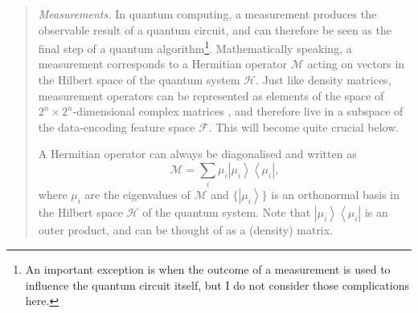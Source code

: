 \documentclass[aps, reprint, onecolumn, nofootinbib, longbibliography]{revtex4-2}
\newcommand{\ket}[1]{\ensuremath{\left| #1 \right \rangle}}
\newcommand{\bra}[1]{\ensuremath{\left \langle #1 \right |}}
\newcommand{\ketbra}[2]{\ket{#1}\!\bra{#2}}
\newcommand{\meas}{\mathcal{M}}
\begin{document}
\begin{quote}
    \textit{Measurements.}  In quantum computing, a measurement produces the observable result of a quantum circuit, and can therefore be seen as the final step of a quantum algorithm\footnote{An important exception is when the outcome of a measurement is used to influence the quantum circuit itself, but I do not consider those complications here.}. Mathematically speaking, a measurement corresponds to a Hermitian operator $\meas$ acting on vectors in the Hilbert space of the quantum system $\mathcal{H}$. Just like density matrices, measurement operators can be represented as elements of the space of $2^n \times 2^n$-dimensional complex matrices \cite{wolf}, and therefore live in a subspace of the data-encoding feature space $\mathcal{F}$. This will become quite crucial below. 
    
    A Hermitian operator can always be diagonalised and written as 
    \begin{equation}\meas = \sum_i \mu_i \ketbra{\mu_i}{\mu_i},\end{equation}
    where $\mu_i$ are the eigenvalues of $\meas$ and $\{\ket{\mu_i}\}$ is an orthonormal basis in the Hilbert space $\mathcal{H}$ of the quantum system. Note that $\ketbra{\mu_i}{\mu_i}$ is an outer product, and can be thought of as a (density) matrix. 
    

\end{quote}
\end{document}
